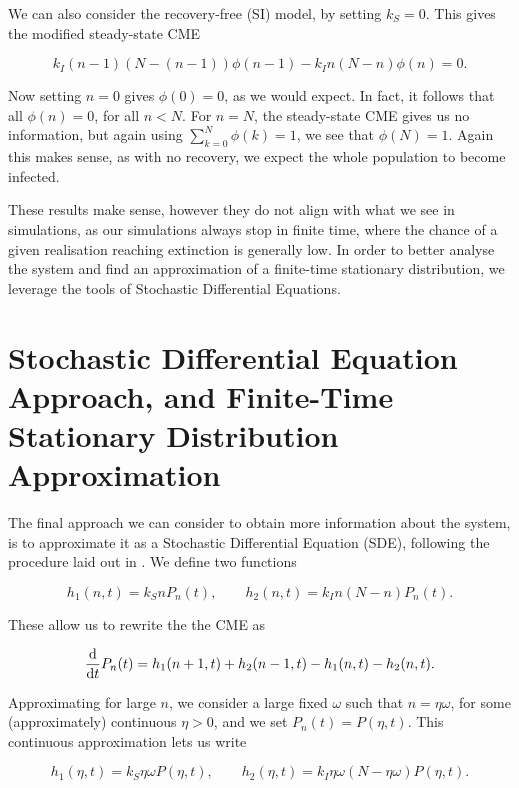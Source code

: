 \documentclass[12pt,a4paper,openany,twoside]{book}
\renewcommand{\d}{{\mathrm d}}
\newcommand{\fd}[2]{\mathchoice{\frac{\d #1}{\d #2}}{\d #1/\d #2}{\d #1/\d #2}{\d #1/\d #2}}
\begin{document}
We can also consider the recovery-free (SI) model, by setting $k_S = 0$. This gives the modified steady-state CME

\begin{equation}
	k_I (n-1)(N-(n-1)) \phi(n-1) - k_I n (N-n) \phi(n) = 0.
\end{equation}

Now setting $n = 0$ gives $\phi(0) = 0$, as we would expect. In fact, it follows that all $\phi(n) = 0$, for all $n < N$. For $n = N$, the steady-state CME gives us no information, but again using $\sum_{k = 0}^N \phi(k) = 1$, we see that $\phi(N) = 1$. Again this makes sense, as with no recovery, we expect the whole population to become infected.

These results make sense, however they do not align with what we see in simulations, as our simulations always stop in finite time, where the chance of a given realisation reaching extinction is generally low. In order to better analyse the system and find an approximation of a finite-time stationary distribution, we leverage the tools of Stochastic Differential Equations.

\section{Stochastic Differential Equation Approach, and Finite-Time Stationary Distribution Approximation}

The final approach we can consider to obtain more information about the system, is to approximate it as a Stochastic Differential Equation (SDE), following the procedure laid out in \citet{erbanStochasticModellingReaction2019}. We define two functions

\begin{equation}
	h_1(n, t) = k_S n P_n(t), \qquad h_2(n, t) = k_I n (N-n) P_n(t).
\end{equation}

These allow us to rewrite the the CME as

\begin{equation}
	\fd {} {t} P_n(t) = h_1 (n+1, t) + h_2 (n-1, t) - h_1 (n, t) - h_2 (n, t).
\end{equation}

Approximating for large $n$, we consider a large fixed $\omega$ such that $n = \eta \omega$, for some (approximately) continuous $\eta > 0$, and we set $P_n(t) = P(\eta, t)$. This continuous approximation lets us write

\begin{equation}
	h_1(\eta, t) = k_S \eta \omega P(\eta, t), \qquad h_2(\eta, t) = k_I \eta \omega (N- \eta \omega) P(\eta, t).
\end{equation}
\end{document}
